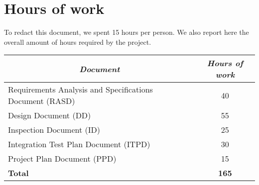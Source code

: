 \chapter{Hours of work}
To redact this document, we spent 15 hours per person. We also report here the overall amount of hours required by the project.
\begin{center}
\setlength{\LTleft}{-15pt}
\begin{longtable}{|l|c|}
\hline
\multicolumn{1}{|c|}{\textit{Document}} & \textit{Hours of work} \\
\hline\hline
Requirements Analysis and Specifications
Document (RASD) &
40 \\\hline
Design Document (DD) &
55 \\\hline
Inspection Document (ID) &
25 \\\hline
Integration Test Plan Document (ITPD) &
30 \\\hline
Project Plan Document (PPD) &
15 \\\hline\hline
\textbf{Total} & \textbf{165} \\\hline
\end{longtable}
\end{center}
